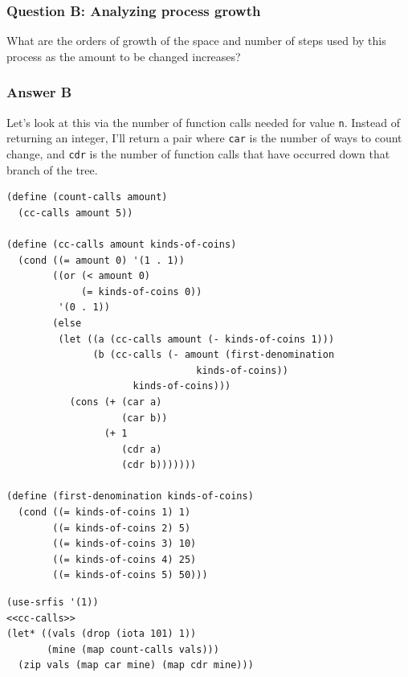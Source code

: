 \documentclass[final,fleqn,titlepage,twoside]{article}
\begin{document}
\subsubsection{Question B: Analyzing process growth}
\label{sec:org72a0160}
What are the orders of growth of the space and number of steps used by this
process as the amount to be changed increases?

\subsubsection{Answer B}
\label{sec:orgaa9a18f}
Let's look at this via the number of function calls needed for value
\texttt{n}. Instead of returning an integer, I'll return a pair where
\texttt{car} is the number of ways to count change, and \texttt{cdr} is
the number of function calls that have occurred down that branch of the tree.

\begin{verbatim}
(define (count-calls amount)
  (cc-calls amount 5))

(define (cc-calls amount kinds-of-coins)
  (cond ((= amount 0) '(1 . 1))
        ((or (< amount 0)
             (= kinds-of-coins 0))
         '(0 . 1))
        (else
         (let ((a (cc-calls amount (- kinds-of-coins 1)))
               (b (cc-calls (- amount (first-denomination
                                 kinds-of-coins))
                      kinds-of-coins)))
           (cons (+ (car a)
                    (car b))
                 (+ 1
                    (cdr a)
                    (cdr b)))))))

(define (first-denomination kinds-of-coins)
  (cond ((= kinds-of-coins 1) 1)
        ((= kinds-of-coins 2) 5)
        ((= kinds-of-coins 3) 10)
        ((= kinds-of-coins 4) 25)
        ((= kinds-of-coins 5) 50)))
\end{verbatim}


\begin{verbatim}
(use-srfis '(1))
<<cc-calls>>
(let* ((vals (drop (iota 101) 1))
       (mine (map count-calls vals)))
  (zip vals (map car mine) (map cdr mine)))
\end{verbatim}
\end{document}
